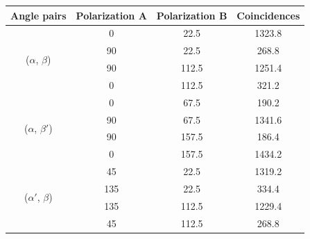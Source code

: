 \documentclass[10pt]{article}
\begin{document}
	\begin{table}
    \def\arraystretch{1.2}
	\centering
    \begin{tabular}{|c|c|c|c|}
    \hline
    \multicolumn{1}{|l|}{\textbf{Angle pairs}}      & \textbf{Polarization A} & \multicolumn{1}{l|}{\textbf{Polarization B}} & \textbf{Coincidences} \\ \hline
    \multirow{4}{*}{($\alpha$, $\beta$)}   & 0                       & 22.5                                         & 1323.8                \\ \cline{2-4} 
                                           & 90                      & 22.5                                         & 268.8                 \\ \cline{2-4} 
                                           & 90                      & 112.5                                        & 1251.4                \\ \cline{2-4} 
                                           & 0                       & 112.5                                        & 321.2                 \\ \hline \hline
    \multirow{4}{*}{($\alpha$, $\beta'$)}  & 0                       & 67.5                                         & 190.2                 \\ \cline{2-4} 
                                           & 90                      & 67.5                                         & 1341.6                \\ \cline{2-4} 
                                           & 90                      & 157.5                                        & 186.4                 \\ \cline{2-4} 
                                           & 0                       & 157.5                                        & 1434.2                \\ \hline \hline
    \multirow{4}{*}{($\alpha'$, $\beta$)}  & 45                      & 22.5                                         & 1319.2                \\ \cline{2-4} 
                                           & 135                     & 22.5                                         & 334.4                 \\ \cline{2-4} 
                                           & 135                     & 112.5                                        & 1229.4                \\ \cline{2-4} 
                                           & 45                      & 112.5                                        & 268.8                 \\ \hline \hline

\end{tabular}
\end{table}
\end{document}
